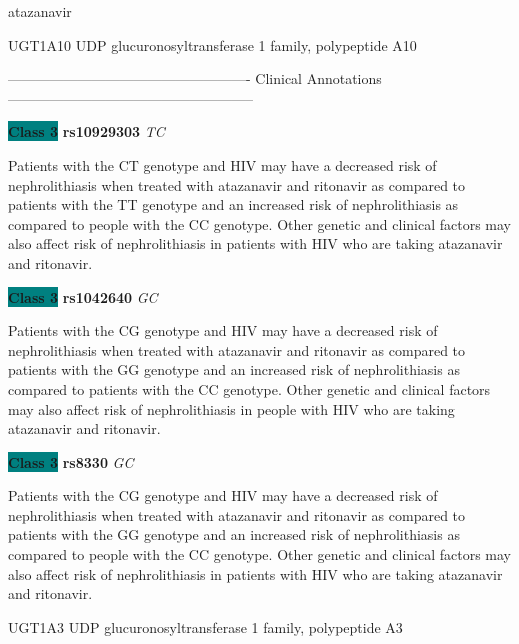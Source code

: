 \documentclass{resume} %
\begin{document}
\begin{rSection}{ atazanavir }
\begin{rSubsection}{ UGT1A10 }{ UDP glucuronosyltransferase 1 family, polypeptide A10 }{}{}
\item[] ---------------------------------------------------- Clinical Annotations -----------------------------------------------------\newline
\item \textbf{\colorbox{teal} {Class 3}} \textbf{ rs10929303 } \textit{ TC }
\item[] Patients with the CT genotype and HIV may have a decreased risk of nephrolithiasis when treated with atazanavir and ritonavir as compared to patients with the TT genotype and an increased risk of nephrolithiasis as compared to people with the CC genotype. Other genetic and clinical factors may also affect risk of nephrolithiasis in patients with HIV who are taking atazanavir and ritonavir. \item \textbf{\colorbox{teal} {Class 3}} \textbf{ rs1042640 } \textit{ GC }
\item[] Patients with the CG genotype and HIV may have a decreased risk of nephrolithiasis when treated with atazanavir and ritonavir as compared to patients with the GG genotype and an increased risk of nephrolithiasis as compared to patients with the CC genotype. Other genetic and clinical factors may also affect risk of nephrolithiasis in people with HIV who are taking atazanavir and ritonavir.\item \textbf{\colorbox{teal} {Class 3}} \textbf{ rs8330 } \textit{ GC }
\item[] Patients with the CG genotype and HIV may have a decreased risk of nephrolithiasis when treated with atazanavir and ritonavir as compared to patients with the GG genotype and an increased risk of nephrolithiasis as compared to people with the CC genotype. Other genetic and clinical factors may also affect risk of nephrolithiasis in patients with HIV who are taking atazanavir and ritonavir.
\end{rSubsection}\begin{rSubsection}{ UGT1A3 }{ UDP glucuronosyltransferase 1 family, polypeptide A3 }{}{}
\item[]


\end{rSubsection}
\end{rSection}
\end{document}
